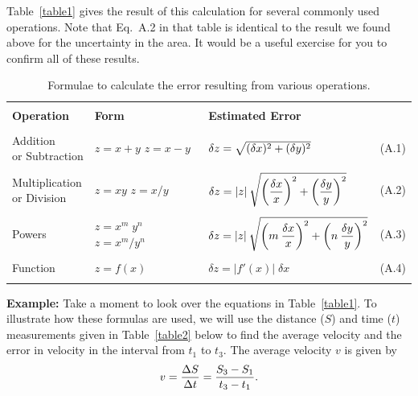 Table~\ref{table1} gives the result of this
calculation for several commonly used operations.  Note that Eq.~A.2 in
that table is identical to the result we found above for the
uncertainty in the area.
It would be a useful exercise for you to confirm all of these results.

\begin{table}[ht]
\begin{center}
\caption{Formulae to calculate the error resulting from various operations.
   \label{table1}}
\vspace{12pt}
\begin{tabular}{|llll|}
\hline
 & & &   \\
{\bf Operation} & {\bf Form} & {\bf Estimated Error} & \\
 & & &   \\
\parbox{1.1in}{Addition\\
\hspace*{1ex} or Subtraction} & \parbox{.6in}{$z = x+y$ \\ $z=x-y$} &
   $\delta z = \sqrt{  (\delta x)^{2} \mathstrut+ (\delta y)^{2} } $ & (A.1) \\
 & & & \\
\parbox{1.1in}{Multiplication \\
\hspace*{1ex} or Division}& \parbox{.6in}{$z = xy$ \\ $z=x/y$} &
${\displaystyle\delta z=|z| \: \sqrt{ 
\left( { \delta x  \over x} \right)^2+
\left( { \delta y  \over y} \right)^2}}$
   & (A.2) \\
 & & &   \\
Powers & \parbox{.8in}{
$z = x^{m}\;y^{n}$\\ ${z} = x^{m}/y^{n}$} &
   $ {\displaystyle\delta z = |z| \: \sqrt{ \left (m \: {{\delta x}
\over
{x}}\right)^{2} + \left(n \: {{\delta y} \over {y}}\right)^{2} }}$ & (A.3)
\\ & & & \\
Function & 
$z = f(x)$ &
   $ {\displaystyle\delta z = \left|f'(x)\right|\; \delta x}$ & (A.4)
\\ & & & \\
\hline
\end{tabular}
\label{errorprop}
\end{center}
\end{table}

{\bf Example: }
Take a moment to look over the equations in Table~\ref{table1}.  To
illustrate how these formulas are used, we will use the distance ($S$)
and time ($t$) measurements given in Table~\ref{table2} below to find
the average velocity and the error in velocity in the interval from
$t_1$ to $t_3$.  The average velocity $v$ is given by
\[
v = {\Delta S \over {\Delta t}} = {{S_{3} - S_{1}} \over {t_{3} -
t_{1}}} .
\]

